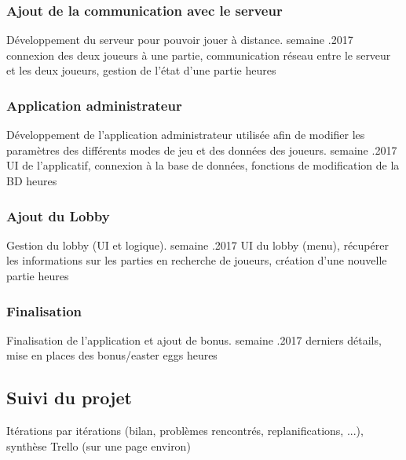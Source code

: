 \documentclass[a4paper,11pt]{article}
\begin{document}
	\subsubsection{Ajout de la communication avec le serveur}
	\begin{enumerate}[labelwidth=5em,leftmargin=8em]
		\objectif Développement du serveur pour pouvoir jouer à distance.
		 semaine
		.2017
		\partageTache connexion des deux joueurs à une partie, communication réseau entre le serveur et les deux joueurs, gestion de l'état d'une partie
		 heures
	\end{enumerate}

	\subsubsection{Application administrateur}
	\begin{enumerate}[labelwidth=5em,leftmargin=8em]
		\objectif Développement de l'application administrateur utilisée afin de modifier les paramètres des différents modes de jeu et des données des joueurs.
		 semaine
		.2017
		\partageTache UI de l'applicatif, connexion à la base de données, fonctions de modification de la BD
		 heures
	\end{enumerate}

	\subsubsection{Ajout du Lobby}
	\begin{enumerate}[labelwidth=5em,leftmargin=8em]
		\objectif Gestion du lobby (UI et logique).
		 semaine
		.2017
		\partageTache UI du lobby (menu), récupérer les informations sur les parties en recherche de joueurs, création d'une nouvelle partie
		 heures
	\end{enumerate}

	\subsubsection{Finalisation}
	\begin{enumerate}[labelwidth=5em,leftmargin=8em]
		\objectif Finalisation de l'application et ajout de bonus.
		 semaine
		.2017
		\partageTache derniers détails, mise en places des bonus/easter eggs
		 heures
	\end{enumerate}

	
	\subsection{Suivi du projet}
	Itérations par itérations (bilan, problèmes rencontrés, replanifications, ...), synthèse Trello (sur une page environ)
	
\end{document}
